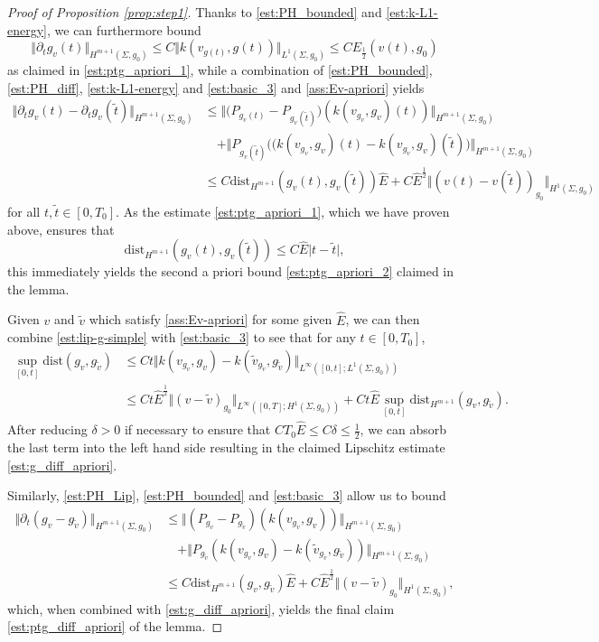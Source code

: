 \documentclass[10pt,reqno]{amsart}
\theoremstyle{plain}
\theoremstyle{definition}
\numberwithin{equation}{section}
\newcommand{\de}{\delta}
\newcommand{\Si}{\Sigma}
\newcommand{\norm}[1]{\Vert#1\Vert}
\newcommand{\beqas}{\begin{equation*}\begin{aligned}}
\newcommand{\eeqas}{\end{aligned}\end{equation*}}
\newcommand{\half}{\frac{1}{2}}
\newcommand{\pt}{\partial_t}
\newcommand{\abs}[1]{\vert#1\vert}
\newcommand{\dist}{\text{dist}}
\newcommand{\Eh}{E_{\half}} %
\newcommand{\Eupp}{\hat E}
\begin{document}
\begin{proof}[Proof of Proposition \ref{prop:step1}]
    Thanks to \eqref{est:PH_bounded} and \eqref{est:k-L1-energy}, we can furthermore bound
    $$\norm{\pt g_v(t)}_{H^{m+1}(\Si,g_0)}\leq C \norm{k(v_{g(t)},g(t))}_{L^1(\Si,g_0)}\leq C\Eh(v(t),g_0)$$ 
    as claimed in \eqref{est:ptg_apriori_1}, while a combination of \eqref{est:PH_bounded}, \eqref{est:PH_diff}, \eqref{est:k-L1-energy} and \eqref{est:basic_3} and  \eqref{ass:Ev-apriori} yields
    \beqas
        \norm{\pt g_v(t)-\pt g_v(\tilde t)}_{H^{m+1}(\Si,g_0)} &\leq \norm{\big(P_{g_v(t)}-P_{g_v(\tilde t)}\big)(k(v_{g_v},g_v)(t))}_{H^{m+1}(\Si,g_0)}\\
        &\quad +\norm{P_{g_v(\tilde t)}\big((k(v_{g_v},g_v)(t)-k(v_{g_v},g_v)(\tilde t)\big)}_{H^{m+1}(\Si,g_0)}\\
        &\leq  C \dist_{H^{m+1}}(g_v(t),g_v(\tilde t)) \Eupp +C \Eupp^\half \norm{(v(t)-v(\tilde t))_{g_0}}_{H^1(\Si,g_0)}
    \eeqas 
    for all $t,\tilde t\in [0,T_0]$. As the estimate \eqref{est:ptg_apriori_1}, which we have proven above, ensures that 
    \begin{equation*}
        \dist_{H^{m+1}}(g_v(t),g_v(\tilde t))\leq C \Eupp \abs{t-\tilde t},
    \end{equation*}
    this immediately yields the second a priori bound \eqref{est:ptg_apriori_2} claimed in the lemma. 

    Given $v$ and $\tilde v$ which satisfy \eqref{ass:Ev-apriori}  for some given $\hat E$, we can then combine \eqref{est:lip-g-simple} with \eqref{est:basic_3} to see that for any $t\in [0,T_0]$,
    \beqas
        \sup_{[0,t]}\dist(g_v,g_{\tilde v})&\leq Ct \norm{k(v_{g_v},g_v)-k(\tilde v_{g_{\tilde v}},g_{\tilde v})}_{L^\infty([0,t];L^1(\Si,g_0))}\\
        &\leq Ct\Eupp^\half \norm{(v-\tilde v)_{g_0}}_{L^\infty([0,T];H^1(\Si,g_0))} +Ct \Eupp \sup_{[0,t]}\dist_{H^{m+1}}(g_v,g_{\tilde v}).
    \eeqas
    After reducing $\de>0$ if necessary to ensure that $CT_0\Eupp \leq C\de\leq \half$, we can absorb the last term into the left hand side resulting in the claimed Lipschitz estimate \eqref{est:g_diff_apriori}. 

    Similarly, \eqref{est:PH_Lip}, \eqref{est:PH_bounded} and \eqref{est:basic_3} allow us to bound
    \beqas
        \norm{\pt(g_v-g_{\tilde v})}_{H^{m+1}(\Si,g_0)} &\leq  \norm{(P_{g_v}-P_{g_{\tilde v}})(k(v_{g_v},g_v))}_{H^{m+1}(\Si,g_0)}\\
        &\quad+\norm{P_{g_{\tilde v}}(k(v_{g_v},g_v)-k(\tilde v_{g_{\tilde v}},g_{\tilde v}))}_{H^{m+1}(\Si,g_0)}\\
        &\leq C\dist_{H^{m+1}}(g_v,g_{\tilde v}) \Eupp+C\Eupp^\half \norm{(v-\tilde v)_{g_0}}_{H^1(\Si,g_0)},
    \eeqas
    which, when combined with \eqref{est:g_diff_apriori}, yields the final claim \eqref{est:ptg_diff_apriori} of the lemma. 
\end{proof}
\end{document}
